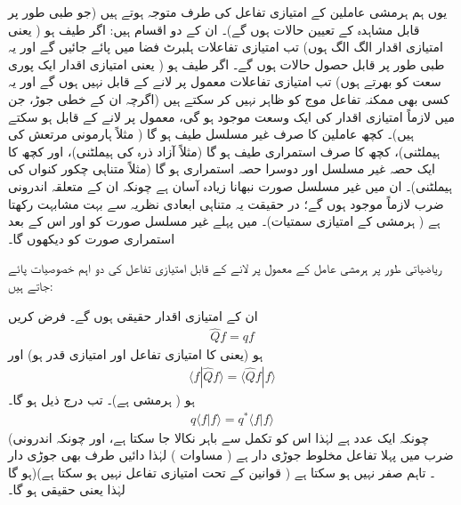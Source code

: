 

یوں ہم  ہرمشی عاملین کے امتیازی تفاعل کی طرف متوجہ ہوتے ہیں (جو    طبی طور پر  قابل مشاہدہ  کے تعیین حالات ہوں گے)۔  ان کے دو اقسام ہیں:   اگر  طیف  ہو ( یعنی امتیازی اقدار الگ الگ ہوں)   تب امتیازی تفاعلات ہلبرٹ  فضا  میں پائے جائیں گے   اور یہ طبی طور پر قابل حصول حالات  ہوں گے۔  اگر طیف  ہو  (  یعنی امتیازی اقدار ایک  پوری سعت  کو بھرتے ہوں)  تب امتیازی تفاعلات معمول پر لانے کے قابل نہیں ہوں گے   اور یہ کسی بھی ممکنہ تفاعل موج کو ظاہر نہیں کر سکتے ہیں (اگرچہ   ان کے  خطی جوڑ،  جن میں  لازماً  امتیازی اقدار کی ایک وسعت موجود ہو گی،  معمول پر لانے کے قابل ہو سکتے ہیں)۔  کچھ  عاملین کا صرف غیر مسلسل طیف ہو گا (  مثلاً   ہارمونی مرتعش کی ہیملٹنی)،   کچھ  کا صرف استمراری  طیف  ہو گا (مثلاً  آزاد ذرہ کی ہیملٹنی)،   اور کچھ  کا  ایک  حصہ غیر مسلسل اور دوسرا  حصہ استمراری ہو گا (مثلاً متناہی  چکور کنواں کی  ہیملٹنی)۔  ان میں   غیر مسلسل صورت نبھانا زیادہ آسان ہے چونکہ ان کے متعلقہ اندرونی ضرب لازماً موجود ہوں گے؛   در حقیقت یہ متناہی ابعادی نظریہ سے بہت مشابہت رکھتا ہے (  ہرمشی  کے امتیازی سمتیات)۔  میں پہلے غیر مسلسل صورت کو  اور اس کے بعد  استمراری  صورت کو دیکھوں گا۔  

ریاضیاتی طور پر ہرمشی عامل کے معمول پر لانے کے قابل امتیازی تفاعل کی دو اہم خصوصیات پائے جاتے  ہیں:
  
ان کے امتیازی اقدار حقیقی ہوں گے۔  
 فرض کریں
\begin{align*}
\hat{Q}f = qf 
\end{align*}
ہو (یعنی    کا امتیازی تفاعل     اور  امتیازی قدر  ہو)       اور 
\begin{align*}
\langle f | \hat{Q}  f \rangle = \langle \hat{Q} f | f  \rangle
\end{align*}
ہو ( ہرمشی ہے)۔  تب درج ذیل ہو گا۔
\begin{align*}
q\langle f \left\vert f \right.  \rangle = q^{*} \langle f \left\vert f \right. \rangle
\end{align*}
(چونکہ  ایک عدد ہے  لہٰذا  اس کو  تکمل سے باہر نکالا   جا سکتا ہے،   اور چونکہ اندرونی ضرب میں پہلا تفاعل مخلوط جوڑی دار ہے ( مساوات  )   لہٰذا  دائیں طرف   بھی جوڑی دار ہو گا)۔ تاہم    صفر نہیں ہو سکتا ہے (  قوانین کے تحت  امتیازی تفاعل نہیں ہو سکتا ہے) لہٰذا    یعنی   حقیقی ہو گا۔

